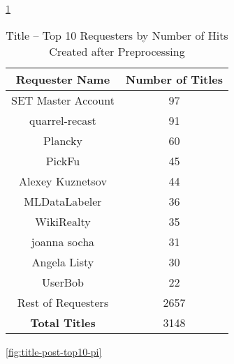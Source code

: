 \documentclass[letterpaper,12pt]{article}
\begin{document}
\ref{tab:title_requester_top_10}
\begin{table}
	\caption{\label{tab:title_requester_top_10} Title -- Top 10 Requesters by Number of Hits Created after Preprocessing}
	\begin{center}
		\begin{tabular}{| c | c |}
			\hline
			\textbf{Requester Name} &  \textbf{Number of Titles} \\
			\hline
			SET Master Account &              97 \\
			\hline
			quarrel-recast     &              91 \\
			\hline
			Plancky            &              60 \\
			\hline
			PickFu             &              45 \\
			\hline
			Alexey Kuznetsov   &              44 \\
			\hline
			MLDataLabeler      &              36 \\
			\hline
			WikiRealty         &              35 \\
			\hline
			joanna socha       &              31 \\
			\hline
			Angela Listy       &              30 \\
			\hline
			UserBob            &              22 \\
			\hline
			Rest of Requesters &            2657 \\
			\hline
			\textbf{Total Titles} & 3148 \\
			\hline
		\end{tabular}
	\end{center}
\end{table}

\ref{fig:title-post-top10-pi}
\newpage
\end{document}
